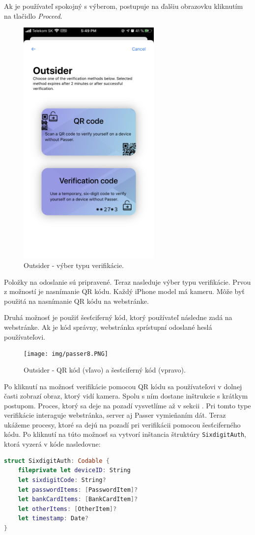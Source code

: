 Ak je používateľ spokojný s výberom, postupuje na ďalšiu obrazovku kliknutím na tlačidlo \textit{Proceed}.

\begin{figure}[H]
  \centering
  \includegraphics[width=7cm]{img/passer7.PNG}
  \caption{Outsider - výber typu verifikácie.}
  \label{passer7}
\end{figure}
Položky na odoslanie sú pripravené. Teraz nasleduje výber typu verifikácie. Prvou z možností je nasnímanie QR kódu. Každý iPhone model má kameru. Môže byť použitá na nasnímanie QR kódu na webstránke.

Druhá možnosť je použiť šesťciferný kód, ktorý používateľ následne zadá na webstránke. Ak je kód správny, webstránka sprístupní odoslané heslá používateľovi.

\begin{figure}[ht]
  \centering
  \texttt{[image: img/passer8.PNG]}
  \caption{Outsider - QR kód (vľavo) a šesťciferný kód (vpravo).}
  \label{passer8}
\end{figure}

Po kliknutí na možnosť verifikácie pomocou QR kódu sa používateľovi v dolnej časti zobrazí obraz, ktorý vidí kamera. Spolu s ním dostane inštrukcie s krátkym postupom. Proces, ktorý sa deje na pozadí vysvetlíme až v sekcii . Pri tomto type verifikácie interaguje webstránka, server aj Passer vymieňaním dát.
\newpage
Teraz ukážeme procesy, ktoré sa dejú na pozadí pri verifikácii pomocou šesťciferného kódu. Po kliknutí na túto možnosť sa vytvorí inštancia štruktúry \texttt{SixdigitAuth}, ktorá vyzerá v kóde nasledovne:
\newline
\begin{lstlisting}[language=Swift, basicstyle=\small]
struct SixdigitAuth: Codable {
    fileprivate let deviceID: String
    let sixdigitCode: String?
    let passwordItems: [PasswordItem]?
    let bankCardItems: [BankCardItem]?
    let otherItems: [OtherItem]?
    let timestamp: Date?
}
\end{lstlisting}


